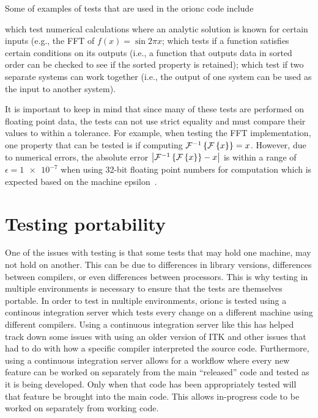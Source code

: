 Some of examples of tests that are used in the \gls{orionc} code include
\begin{enumerate*}[label={}]
	 which test numerical
		calculations where an analytic solution is known
		for certain inputs (e.g., the \acrshort{FFT} of
		\(f(x) = \sin 2\pi{}x\);
	 which tests if a function
		satisfies certain conditions on its outputs (i.e.,
		a function that outputs data in sorted order can
		be checked to see if the sorted property is
		retained);
	 which test if two
		separate systems can work together (i.e., the
		output of one system can be used as the input to
		another system).
\end{enumerate*}

It is important to keep in mind that since many of these tests are
performed on floating point data, the tests can not use strict
equality and must compare their values to within a tolerance. For
example, when testing the FFT implementation, one property that
can be tested is if computing \(\mathcal{F}^{-1}\left\{\mathcal{F}\left\{x\right\}\right\} =
x\). However, due to numerical errors, the absolute error \(\left| \mathcal{F}^{-1}\left\{\mathcal{F}\left\{x\right\}\right\} -
x \right|\) is within a range of \(\epsilon = \num{1e-7}\) when
using 32-bit floating point numbers for
computation which is expected based on the machine epsilon~\autocite{fftw:accuracy-bench,Tashce:FFT-error}.

\section{Testing portability}

One of the issues with testing is that some tests that may hold
one machine, may not hold on another. This can be due to
differences in library versions, differences between compilers, or
even differences between processors. This is why testing in
multiple environments is necessary to ensure that the tests are
themselves portable. In order to test in multiple environments,
\gls{orionc} is tested using a continous integration server which
tests every change on a different machine using different
compilers. Using a continuous integration server like this has
helped track down some issues with using an older version of ITK
and other issues that had to do with how a specific compiler
interpreted the source code.
Furthermore, using a continuous integration server allows for a
workflow where every new feature can be worked on separately from
the main ``released'' code and tested as it is being developed.
Only when that code has been appropriately tested will that
feature be brought into the main code. This allows in-progress
code to be worked on separately from working code.

